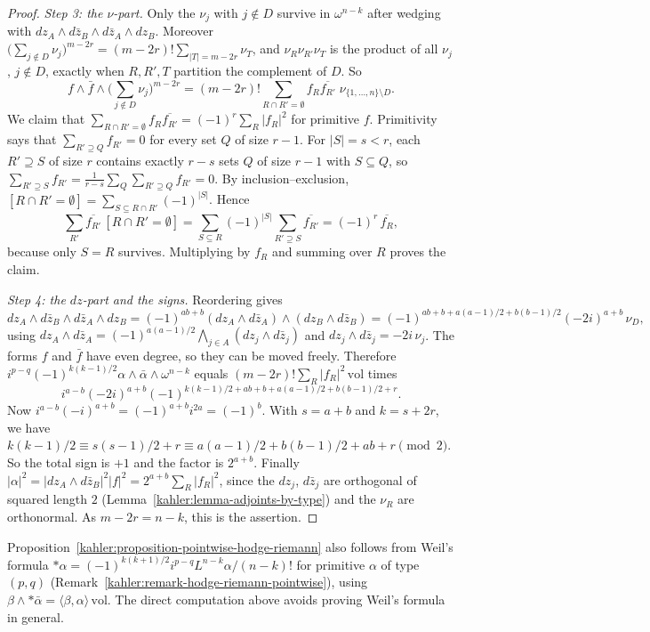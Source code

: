 \begin{proof}
\emph{Step 3: the $\nu$-part.} Only the $\nu_j$ with $j \notin D$ survive in $\omega^{n-k}$ after wedging with $dz_A \wedge d\bar z_B \wedge d\bar z_A \wedge dz_B$.
Moreover $\big(\sum_{j \notin D}\nu_j\big)^{m-2r} = (m-2r)!\sum_{|T|=m-2r}\nu_T$, and $\nu_R\nu_{R'}\nu_T$ is the product of all $\nu_j$, $j \notin D$, exactly
when $R, R', T$ partition the complement of $D$. So
\[
f \wedge \bar f \wedge \Big(\sum_{j \notin D}\nu_j\Big)^{m-2r} = (m-2r)!\sum_{R \cap R' = \emptyset}f_R\overline{f_{R'}}\;\nu_{\{1, \ldots, n\} \setminus D}.
\]
We claim that $\sum_{R \cap R' = \emptyset}f_R\overline{f_{R'}} = (-1)^r\sum_R|f_R|^2$ for primitive $f$. Primitivity says that
$\sum_{R' \supseteq Q}f_{R'} = 0$ for every set $Q$ of size $r - 1$. For $|S| = s < r$, each $R' \supseteq S$ of size $r$ contains exactly $r - s$ sets
$Q$ of size $r - 1$ with $S \subseteq Q$, so $\sum_{R' \supseteq S}f_{R'} = \frac{1}{r-s}\sum_Q\sum_{R' \supseteq Q}f_{R'} = 0$. By
inclusion--exclusion, $[R \cap R' = \emptyset] = \sum_{S \subseteq R \cap R'}(-1)^{|S|}$. Hence
\[
\sum_{R'}\overline{f_{R'}}\,[R \cap R' = \emptyset] = \sum_{S \subseteq R}(-1)^{|S|}\sum_{R' \supseteq S}\overline{f_{R'}} = (-1)^r\,\overline{f_R},
\]
because only $S = R$ survives. Multiplying by $f_R$ and summing over $R$ proves the claim.

\emph{Step 4: the $dz$-part and the signs.} Reordering gives
\[
dz_A \wedge d\bar z_B \wedge d\bar z_A \wedge dz_B = (-1)^{ab + b}(dz_A \wedge d\bar z_A) \wedge (dz_B \wedge d\bar z_B)
= (-1)^{ab + b + a(a-1)/2 + b(b-1)/2}(-2i)^{a+b}\,\nu_D,
\]
using $dz_A \wedge d\bar z_A = (-1)^{a(a-1)/2}\bigwedge_{j \in A}(dz_j \wedge d\bar z_j)$ and $dz_j \wedge d\bar z_j = -2i\,\nu_j$. The forms $f$ and $\bar f$
have even degree, so they can be moved freely. Therefore $i^{p-q}(-1)^{k(k-1)/2}\alpha \wedge \bar\alpha \wedge \omega^{n-k}$ equals
$(m-2r)!\sum_R|f_R|^2\,\mathrm{vol}$ times
\[
i^{a-b}(-2i)^{a+b}(-1)^{k(k-1)/2 + ab + b + a(a-1)/2 + b(b-1)/2 + r} .
\]
Now $i^{a-b}(-i)^{a+b} = (-1)^{a+b}i^{2a} = (-1)^b$. With $s = a + b$ and $k = s + 2r$, we have
$k(k-1)/2 \equiv s(s-1)/2 + r \equiv a(a-1)/2 + b(b-1)/2 + ab + r \pmod 2$. So the total sign is $+1$ and the factor is $2^{a+b}$. Finally
$|\alpha|^2 = |dz_A \wedge d\bar z_B|^2|f|^2 = 2^{a+b}\sum_R|f_R|^2$, since the $dz_j$, $d\bar z_j$ are orthogonal of squared length $2$
(Lemma~\ref{kahler:lemma-adjoints-by-type}) and the $\nu_R$ are orthonormal. As $m - 2r = n - k$, this is the assertion.
\end{proof}

\begin{remark}\label{kahler:remark-weil-formula}
Proposition~\ref{kahler:proposition-pointwise-hodge-riemann} also follows from Weil's formula
$*\alpha = (-1)^{k(k+1)/2}i^{p-q}L^{n-k}\alpha/(n-k)!$ for primitive $\alpha$ of type $(p,q)$ (Remark~\ref{kahler:remark-hodge-riemann-pointwise}),
using $\beta \wedge *\bar\alpha = \langle\beta, \alpha\rangle\,\mathrm{vol}$. The direct computation above avoids proving Weil's formula in
general.
\end{remark}

